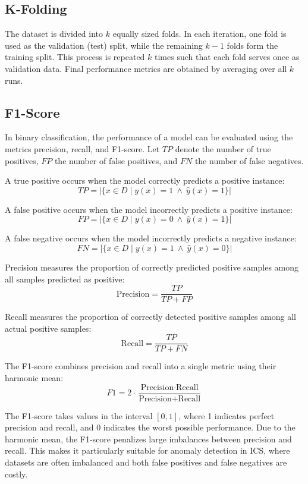 \subsection{K-Folding}
The dataset is divided into $k$ equally sized folds.
In each iteration, one fold is used as the validation (test) split,
while the remaining $k-1$ folds form the training split.
This process is repeated $k$ times such that each fold serves once
as validation data. Final performance metrics are obtained by
averaging over all $k$ runs.  

\subsection{F1-Score}
In binary classification, the performance of a model can be evaluated using the metrics precision, recall, and F1-score. Let $TP$ denote the number of true positives, $FP$ the number of false positives, and $FN$ the number of false negatives.

A true positive occurs when the model correctly predicts a positive instance:
\[
TP = |\{x \in D \mid y(x) = 1 \ \wedge \ \hat{y}(x) = 1\}|
\]

A false positive occurs when the model incorrectly predicts a positive instance:
\[
FP = |\{x \in D \mid y(x) = 0 \ \wedge \ \hat{y}(x) = 1\}|
\]

A false negative occurs when the model incorrectly predicts a negative instance:
\[
FN = |\{x \in D \mid y(x) = 1 \ \wedge \ \hat{y}(x) = 0\}|
\]

Precision measures the proportion of correctly predicted positive samples 
among all samples predicted as positive:
\begin{equation}
\text{Precision} = \frac{TP}{TP + FP}
\end{equation}

Recall measures the proportion of correctly detected positive samples 
among all actual positive samples:
\begin{equation}
\text{Recall} = \frac{TP}{TP + FN}
\end{equation}

The F1-score combines precision and recall into a single metric using their 
harmonic mean:
\begin{equation}
F1 = 2 \cdot \frac{\text{Precision} \cdot \text{Recall}}{\text{Precision} + \text{Recall}}
\end{equation}

The F1-score takes values in the interval $[0,1]$, where 1 indicates perfect 
precision and recall, and 0 indicates the worst possible performance. 
Due to the harmonic mean, the F1-score penalizes large imbalances between 
precision and recall. This makes it particularly suitable for anomaly detection 
in \ac{ICS}, where datasets are often imbalanced and 
both false positives and false negatives are costly.

